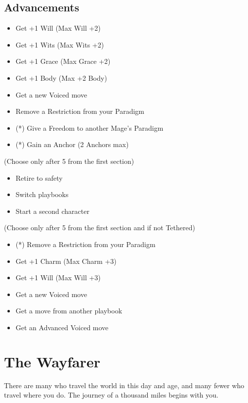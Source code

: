 \documentclass[10pt,twoside,openright]{memoir}
\begin{document}
\hypertarget{advancements-7}{%
\subsection{Advancements}\label{advancements-7}}

\begin{itemize}
\tightlist
\item
  Get +1 Will (Max Will +2)
\item
  Get +1 Wits (Max Wits +2)
\item
  Get +1 Grace (Max Grace +2)
\item
  Get +1 Body (Max +2 Body)
\item
  Get a new Voiced move
\item
  Remove a Restriction from your Paradigm
\item
  (*) Give a Freedom to another Mage's Paradigm
\item
  (*) Gain an Anchor (2 Anchors max)
\end{itemize}

(Choose only after 5 from the first section)

\begin{itemize}
\tightlist
\item
  Retire to safety
\item
  Switch playbooks
\item
  Start a second character
\end{itemize}

(Choose only after 5 from the first section and if not Tethered)

\begin{itemize}
\tightlist
\item
  (*) Remove a Restriction from your Paradigm
\item
  Get +1 Charm (Max Charm +3)
\item
  Get +1 Will (Max Will +3)
\item
  Get a new Voiced move
\item
  Get a move from another playbook
\item
  Get an Advanced Voiced move
\end{itemize}

\newpage

\hypertarget{the-wayfarer}{%
\section{The Wayfarer}\label{the-wayfarer}}

There are many who travel the world in this day and age, and many fewer
who travel where you do. The journey of a thousand miles begins with
you.
\end{document}
